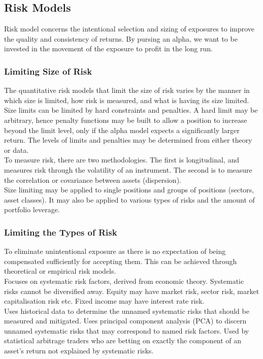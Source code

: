 \subsection{Risk Models}

Risk model concerns the intentional selection and sizing of exposures to improve the quality and consistency of returns. By pursing an alpha, we want to be invested in the movement of the exposure to profit in the long run.

\subsubsection{Limiting Size of Risk}

The quantitative risk models that limit the size of risk varies by the manner in which size is limited, how risk is measured, and what is having its size limited.\\

Size limits can be limited by hard constraints and penalties. A hard limit may be arbitrary, hence penalty functions may be built to allow a position to increase beyond the limit level, only if the alpha model expects a significantly larger return. The levels of limits and penalties may be determined from either theory or data.\\

To measure risk, there are two methodologies. The first is longitudinal, and measures risk through the volatility of an instrument. The second is to measure the correlation or covariance between assets (dispersion).\\

Size limiting may be applied to single positions and groups of positions (sectors, asset classes). It may also be applied to various types of risks and the amount of portfolio leverage.

\subsubsection{Limiting the Types of Risk}

To eliminate unintentional exposure as there is no expectation of being compensated sufficiently for accepting them. This can be achieved through theoretical or empirical risk models.\\

 Focuses on systematic risk factors, derived from economic theory. Systematic risks cannot be diversified away. Equity may have market risk, sector risk, market capitalisation risk etc. Fixed income may have interest rate risk.\\

 Uses historical data to determine the unnamed systematic risks that should be measured and mitigated. Uses principal component analysis (PCA) to discern unnamed systematic risks that may correspond to named risk factors. Used by statistical arbitrage traders who are betting on exactly the component of an asset's return not explained by systematic risks.